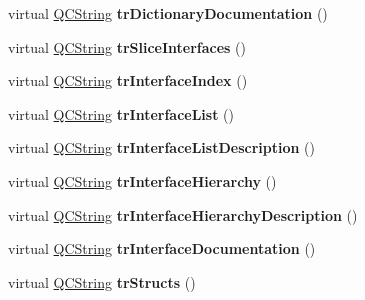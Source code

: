 \begin{DoxyCompactItemize}
\mbox{\label{class_translator_spanish_a2067edc97722c293b2e8601618cda6dc}} 
virtual \mbox{\hyperlink{class_q_c_string}{Q\+C\+String}} {\bfseries tr\+Dictionary\+Documentation} ()
\item 
\mbox{\label{class_translator_spanish_accd9ec36f5fc7e9e6e6e3a7d2ac63c17}} 
virtual \mbox{\hyperlink{class_q_c_string}{Q\+C\+String}} {\bfseries tr\+Slice\+Interfaces} ()
\item 
\mbox{\label{class_translator_spanish_aa415e41084c06aae1426bc4b8b8a7997}} 
virtual \mbox{\hyperlink{class_q_c_string}{Q\+C\+String}} {\bfseries tr\+Interface\+Index} ()
\item 
\mbox{\label{class_translator_spanish_a22cb57fdb0b1dc53642925ba01788b9a}} 
virtual \mbox{\hyperlink{class_q_c_string}{Q\+C\+String}} {\bfseries tr\+Interface\+List} ()
\item 
\mbox{\label{class_translator_spanish_ac5560da53a5ddcaf0e02a3a00215abea}} 
virtual \mbox{\hyperlink{class_q_c_string}{Q\+C\+String}} {\bfseries tr\+Interface\+List\+Description} ()
\item 
\mbox{\label{class_translator_spanish_a754495115d87e0a61dce0132394cc01b}} 
virtual \mbox{\hyperlink{class_q_c_string}{Q\+C\+String}} {\bfseries tr\+Interface\+Hierarchy} ()
\item 
\mbox{\label{class_translator_spanish_ab1eae53c193442ceed37f986252a60b5}} 
virtual \mbox{\hyperlink{class_q_c_string}{Q\+C\+String}} {\bfseries tr\+Interface\+Hierarchy\+Description} ()
\item 
\mbox{\label{class_translator_spanish_a09245cb220a633153956eefa52cb4c67}} 
virtual \mbox{\hyperlink{class_q_c_string}{Q\+C\+String}} {\bfseries tr\+Interface\+Documentation} ()
\item 
\mbox{\label{class_translator_spanish_a0cda5a310298779a495b8892ea0c8394}} 
virtual \mbox{\hyperlink{class_q_c_string}{Q\+C\+String}} {\bfseries tr\+Structs} ()
\item 

\end{DoxyCompactItemize}
